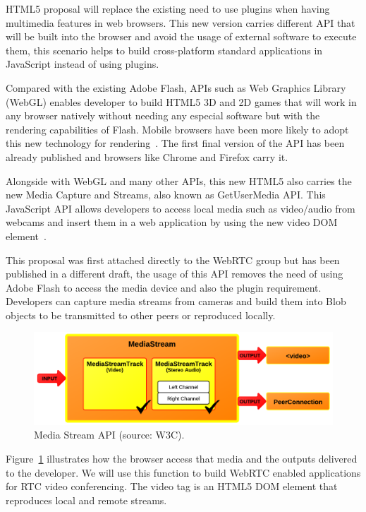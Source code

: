 HTML5 proposal will replace the existing need to use plugins when having multimedia features in web browsers. This new version carries different API that will be built into the browser and avoid the usage of external software to execute them, this scenario helps to build cross-platform standard applications in JavaScript instead of using plugins. 

Compared with the existing Adobe Flash, APIs such as Web Graphics Library (WebGL) enables developer to build HTML5 3D and 2D games that will work in any browser natively without needing any especial software but with the rendering capabilities of Flash. Mobile browsers have been more likely to adopt this new technology for rendering~\cite{webglDraft}. The first final version of the API has been already published and browsers like Chrome and Firefox carry it.

Alongside with WebGL and many other APIs, this new HTML5 also carries the new Media Capture and Streams, also known as GetUserMedia API. This JavaScript API allows developers to access local media such as video/audio from webcams and insert them in a web application by using the new video DOM element~\cite{getusermediaDraft}.

This proposal was first attached directly to the WebRTC group but has been published in a different draft, the usage of this API removes the need of using Adobe Flash to access the media device and also the plugin requirement. Developers can capture media streams from cameras and build them into Blob objects to be transmitted to other peers or reproduced locally.

 \begin{figure}[h]
  \centering
    \includegraphics[scale=1]{./figures/mediastreamAPI.png}
      \caption[Media Stream API (source: W3C)]{Media Stream API (source: W3C).}
	\label{fig:mediastreamAPI}
\end{figure}

Figure~\ref{fig:mediastreamAPI} illustrates how the browser access that media and the outputs delivered to the developer. We will use this function to build WebRTC enabled applications for RTC video conferencing. The video tag is an HTML5 DOM element that reproduces local and remote streams.

